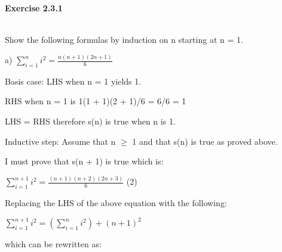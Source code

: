 \documentclass[12pt]{article}
\begin{document}
\begin{title}
    \centering
    {\LARGE\bfseries Exercise 2.3.1}
\end{title}\\

\vspace{10mm} %
Show the following formulas by induction on n starting at n = 1.

\vspace{5mm} %

a) $\sum_{i=1}^{n}i^2 = \frac{n(n+1)(2n+1)}{6}$\par

\vspace{5mm} %

Basis case: LHS when n = 1 yields 1.\par

\vspace{5mm} %

RHS when n = 1 is 1(1 + 1)(2 + 1)/6 = 6/6 = 1\par

LHS = RHS therefore s(n) is true when n is 1.\par

Inductive step: Assume that n $\geq$ 1 and that s(n) is true as proved above.\par I must prove that s(n + 1) is true which is:\par

\vspace{5mm} %

$\sum_{i=1}^{n+1}i^2 = \frac{(n+1)(n+2)(2n+3)}{6}$   \hfil\hfil\hfil (2)\par

\vspace{5mm} %

Replacing the LHS of the above equation with the following:\par

\vspace{5mm} %

$\sum_{i=1}^{n+1}i^2 = (\sum_{i=1}^{n}i^2) + (n + 1)^2$\par

\vspace{5mm} %

which can be rewritten as:\par

\vspace{5mm} %
\end{document}
